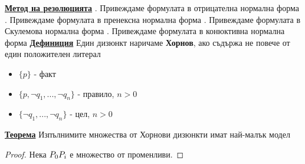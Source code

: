 \documentclass{article}
\begin{document}
\textbf{\underline{Метод на резолюцията}} . Привеждаме формулата в отрицателна нормална форма . Привеждаме формулата в пренексна нормална форма . Привеждаме формулата в Скулемова нормална форма . Привеждаме формулата в конюктивна нормална форма \newline\newline
\textbf{\underline{Дефиниция}}
Един дизюнкт наричаме \textbf{Хорнов}, ако съдържа не повече от един положителен литерал
\begin{itemize}
    \item $\{p\}$ - факт
    \item $\{p, \neg q_1, ..., \neg q_n\}$ - правило, $n > 0$
    \item $\{\neg q_1, ..., \neg q_n\}$ - цел, $n > 0$
\end{itemize}
\textbf{\underline{Теорема}} \newline
Изпълнимите множества от Хорнови дизюнкти имат най-малък модел
\begin{proof}
Нека $P_0 \def \cap_{I \in M}P_i$ е множество от променливи. 
\end{proof}
\end{document}
